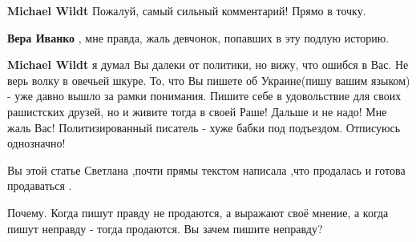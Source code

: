 \begin{itemize}
\begin{itemize}
\textbf{Michael Wildt} Пожалуй, самый сильный комментарий! Прямо в точку.

 
\textbf{Вера Иванко} , мне правда, жаль девчонок, попавших в эту подлую историю.

 
\textbf{Michael Wildt} я думал Вы далеки от политики, но вижу, что ошибся в Вас.
Не верь волку в овечьей шкуре. То, что Вы пишете об Украине(пишу вашим языком) -
уже давно вышло за рамки понимания. Пишите себе в удовольствие для своих
рашистских друзей, но и живите тогда в своей Раше! Дальше и не надо! Мне жаль
Вас! Политизированный писатель - хуже бабки под подъездом. Отписуюсь
однозначно!
\end{itemize}

 

Вы этой статье Светлана ,почти прямы текстом написала ,что продалась и готова
продаваться .

\begin{itemize}
 
Почему. Когда пишут правду не продаются, а выражают своё мнение, а когда пишут
неправду - тогда продаются. Вы зачем пишите неправду?
\end{itemize}

 


\end{itemize}
